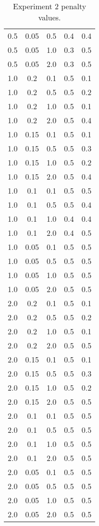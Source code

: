 \begin{table}[ht]
\begin{tabular}{c|c|c|c|c}
0.5 & 0.05 & 0.5 & 0.4 & 0.4 \\
0.5 & 0.05 & 1.0 & 0.3 & 0.5 \\
0.5 & 0.05 & 2.0 & 0.3 & 0.5 \\
1.0 & 0.2 & 0.1 & 0.5 & 0.1 \\
1.0 & 0.2 & 0.5 & 0.5 & 0.2 \\
1.0 & 0.2 & 1.0 & 0.5 & 0.1 \\
1.0 & 0.2 & 2.0 & 0.5 & 0.4 \\
1.0 & 0.15 & 0.1 & 0.5 & 0.1 \\
1.0 & 0.15 & 0.5 & 0.5 & 0.3 \\
1.0 & 0.15 & 1.0 & 0.5 & 0.2 \\
1.0 & 0.15 & 2.0 & 0.5 & 0.4 \\
1.0 & 0.1 & 0.1 & 0.5 & 0.5 \\
1.0 & 0.1 & 0.5 & 0.5 & 0.4 \\
1.0 & 0.1 & 1.0 & 0.4 & 0.4 \\
1.0 & 0.1 & 2.0 & 0.4 & 0.5 \\
1.0 & 0.05 & 0.1 & 0.5 & 0.5 \\
1.0 & 0.05 & 0.5 & 0.5 & 0.5 \\
1.0 & 0.05 & 1.0 & 0.5 & 0.5 \\
1.0 & 0.05 & 2.0 & 0.5 & 0.5 \\
2.0 & 0.2 & 0.1 & 0.5 & 0.1 \\
2.0 & 0.2 & 0.5 & 0.5 & 0.2 \\
2.0 & 0.2 & 1.0 & 0.5 & 0.1 \\
2.0 & 0.2 & 2.0 & 0.5 & 0.5 \\
2.0 & 0.15 & 0.1 & 0.5 & 0.1 \\
2.0 & 0.15 & 0.5 & 0.5 & 0.3 \\
2.0 & 0.15 & 1.0 & 0.5 & 0.2 \\
2.0 & 0.15 & 2.0 & 0.5 & 0.5 \\
2.0 & 0.1 & 0.1 & 0.5 & 0.5 \\
2.0 & 0.1 & 0.5 & 0.5 & 0.5 \\
2.0 & 0.1 & 1.0 & 0.5 & 0.5 \\
2.0 & 0.1 & 2.0 & 0.5 & 0.5 \\
2.0 & 0.05 & 0.1 & 0.5 & 0.5 \\
2.0 & 0.05 & 0.5 & 0.5 & 0.5 \\
2.0 & 0.05 & 1.0 & 0.5 & 0.5 \\
2.0 & 0.05 & 2.0 & 0.5 & 0.5 \\
\hline

\end{tabular}
\caption{Experiment 2 penalty values.}
\label{tab:Penalties}
\end{table}




